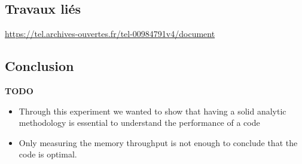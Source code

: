 




    

\subsection{Travaux liés}
\url{https://tel.archives-ouvertes.fr/tel-00984791v4/document}


\subsection{Conclusion}

\textbf{TODO}
\begin{itemize}
    \item Through this experiment we wanted to show that having a solid analytic methodology is essential to understand the performance of a code
    \item Only measuring the memory throughput is not enough to conclude that the code is optimal. 
\end{itemize}


\printbibliography[heading=references,segment=\therefsegment]

